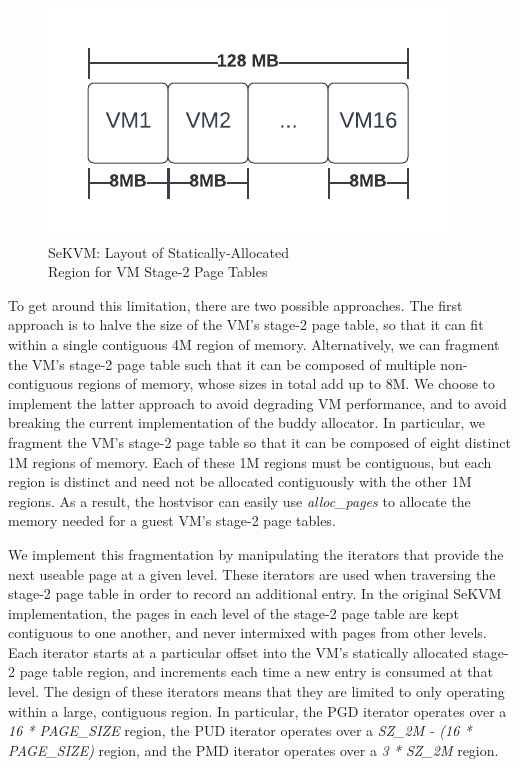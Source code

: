 \begin{figure}[h!tbp]
\centering
\captionsetup{justification=centering}
\includegraphics{sekvm_vm_region}
\caption{SeKVM: Layout of Statically-Allocated\\Region for VM Stage-2 Page Tables}
\label{fig:sekvmvmregions}
\end{figure}

\bigskip To get around this limitation, there are two possible approaches. The first approach
is to halve the size of the VM's stage-2 page table, so that it can fit within
a single contiguous 4M region of memory. Alternatively, we can fragment the VM's stage-2
page table such that it can be composed of multiple non-contiguous regions of memory, whose sizes in total add up to 8M. We
choose to implement the latter approach to avoid degrading VM performance, and to avoid
breaking the current implementation of the buddy allocator. In
particular, we fragment the VM's stage-2 page table so that it can be composed
of eight distinct 1M regions of memory. Each of these 1M regions must be contiguous,
but each region is distinct and need not be allocated contiguously with the
other 1M regions. As a result, the hostvisor can easily use \textit{alloc\_pages}
to allocate the memory needed for a guest VM's stage-2 page tables.

We implement this fragmentation by manipulating the iterators that provide the next useable
page at a given level. These iterators are used when traversing the stage-2 page table in order to record
an additional entry. In the original SeKVM implementation, the pages in each level of the stage-2 page table are
kept contiguous to one another, and never intermixed with pages from other levels.
Each iterator starts at a particular offset into the VM's statically allocated stage-2
page table region, and increments each time a new entry is consumed at that level. The design of these iterators means that they are limited to
only operating within a large, contiguous region. In particular, the PGD iterator operates over a \textit{16 * PAGE\_SIZE} region, the PUD
iterator operates over a \textit{SZ\_2M - (16 * PAGE\_SIZE)} region, and the PMD iterator operates over a \textit{3 * SZ\_2M} region.

